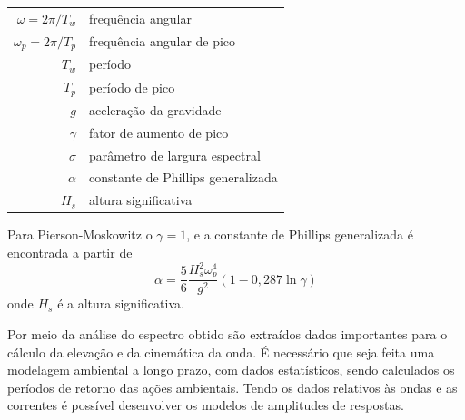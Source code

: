\begin{tabular}{rl}
	$\omega = 2\pi/T_w$   & frequência angular\\
	$\omega_p = 2\pi/T_p$ & frequência angular de pico\\
	$T_w$                 & período\\
	$T_p$                 & período de pico\\
	$g$                   & aceleração da gravidade\\
	$\gamma$              & fator de aumento de pico\\
	$\sigma$              & parâmetro de largura espectral\\
	$\alpha$              & constante de Phillips generalizada\\
	$H_s$                 & altura significativa
\end{tabular}

Para Pierson-Moskowitz o $\gamma=1$, e a constante de Phillips generalizada é encontrada a partir de
\begin{equation}
\label{eq:jdsn-eq3}
\alpha = \frac{5}{6} \frac{H_s^2 \omega_p^4}{g^2} \left(1- 0,287 \ln{\gamma}\right)
\end{equation}
{\color{red}onde $H_s$  é a altura significativa.}


Por meio da análise do espectro obtido são extraídos dados importantes para o cálculo da elevação e da cinemática da onda.
É necessário que seja feita uma modelagem ambiental a longo prazo, com dados estatísticos, sendo calculados os períodos de retorno das ações ambientais.
Tendo os dados relativos às ondas e as correntes é possível desenvolver os modelos de amplitudes de respostas.
